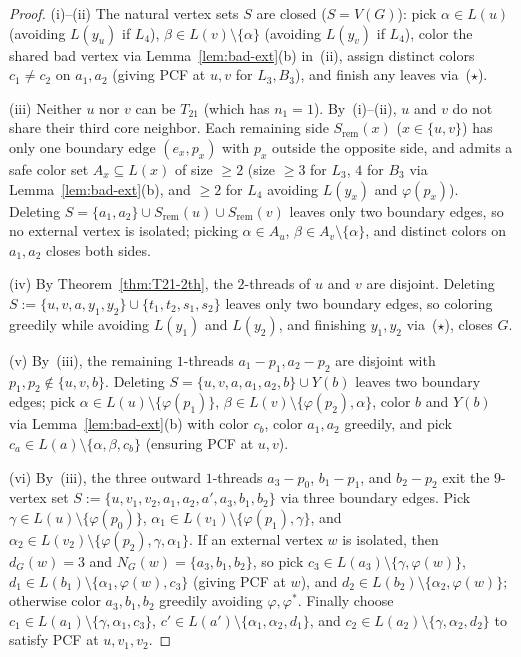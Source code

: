 \documentclass[11pt,a4paper]{article}
\theoremstyle{definition}
\begin{document}
\begin{proof}
(i)--(ii) The natural vertex sets $S$ are closed ($S = V(G)$): pick $\alpha \in L(u)$ (avoiding $L(y_u)$ if $L_4$), $\beta \in L(v) \setminus \{\alpha\}$ (avoiding $L(y_v)$ if $L_4$), color the shared bad vertex via Lemma~\ref{lem:bad-ext}(b) in~(ii), assign distinct colors $c_1 \neq c_2$ on $a_1, a_2$ (giving PCF at $u, v$ for $L_3, B_3$), and finish any leaves via~($\star$).

(iii) Neither $u$ nor $v$ can be $T_{21}$ (which has $n_1 = 1$). By~(i)--(ii), $u$ and $v$ do not share their third core neighbor. Each remaining side $S_{\mathrm{rem}}(x)$ ($x \in \{u, v\}$) has only one boundary edge $(e_x, p_x)$ with $p_x$ outside the opposite side, and admits a safe color set $A_x \subseteq L(x)$ of size $\ge 2$ (size $\ge 3$ for $L_3$, $4$ for $B_3$ via Lemma~\ref{lem:bad-ext}(b), and $\ge 2$ for $L_4$ avoiding $L(y_x)$ and $\varphi(p_x)$). Deleting $S = \{a_1, a_2\} \cup S_{\mathrm{rem}}(u) \cup S_{\mathrm{rem}}(v)$ leaves only two boundary edges, so no external vertex is isolated; picking $\alpha \in A_u$, $\beta \in A_v \setminus \{\alpha\}$, and distinct colors on $a_1, a_2$ closes both sides.

(iv) By Theorem~\ref{thm:T21-2th}, the $2$-threads of $u$ and $v$ are disjoint. Deleting $S := \{u, v, a, y_1, y_2\} \cup \{t_1, t_2, s_1, s_2\}$ leaves only two boundary edges, so coloring greedily while avoiding $L(y_1)$ and $L(y_2)$, and finishing $y_1, y_2$ via~($\star$), closes $G$.

(v) By~(iii), the remaining $1$-threads $a_1 - p_1, a_2 - p_2$ are disjoint with $p_1, p_2 \notin \{u, v, b\}$. Deleting $S = \{u, v, a, a_1, a_2, b\} \cup Y(b)$ leaves two boundary edges; pick $\alpha \in L(u) \setminus \{\varphi(p_1)\}$, $\beta \in L(v) \setminus \{\varphi(p_2), \alpha\}$, color $b$ and $Y(b)$ via Lemma~\ref{lem:bad-ext}(b) with color $c_b$, color $a_1, a_2$ greedily, and pick $c_a \in L(a) \setminus \{\alpha, \beta, c_b\}$ (ensuring PCF at $u, v$).

(vi) By~(iii), the three outward $1$-threads $a_3 - p_0$, $b_1 - p_1$, and $b_2 - p_2$ exit the $9$-vertex set $S := \{u, v_1, v_2, a_1, a_2, a', a_3, b_1, b_2\}$ via three boundary edges. Pick $\gamma \in L(u) \setminus \{\varphi(p_0)\}$, $\alpha_1 \in L(v_1) \setminus \{\varphi(p_1), \gamma\}$, and $\alpha_2 \in L(v_2) \setminus \{\varphi(p_2), \gamma, \alpha_1\}$. If an external vertex $w$ is isolated, then $d_G(w) = 3$ and $N_G(w) = \{a_3, b_1, b_2\}$, so pick $c_3 \in L(a_3) \setminus \{\gamma, \varphi(w)\}$, $d_1 \in L(b_1) \setminus \{\alpha_1, \varphi(w), c_3\}$ (giving PCF at $w$), and $d_2 \in L(b_2) \setminus \{\alpha_2, \varphi(w)\}$; otherwise color $a_3, b_1, b_2$ greedily avoiding $\varphi, \varphi^*$. Finally choose $c_1 \in L(a_1) \setminus \{\gamma, \alpha_1, c_3\}$, $c' \in L(a') \setminus \{\alpha_1, \alpha_2, d_1\}$, and $c_2 \in L(a_2) \setminus \{\gamma, \alpha_2, d_2\}$ to satisfy PCF at $u, v_1, v_2$.
\end{proof}
\end{document}
